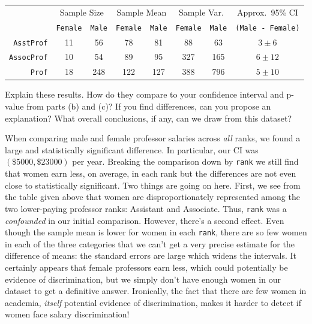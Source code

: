 \documentclass[addpoints,12pt]{exam}
\begin{document}
\begin{questions}
\begin{parts}
\vspace{1em}
\begin{tabular}
	 	{r|cc|cc|cc|c}
	 	&\multicolumn{2}{c|}{Sample Size} & \multicolumn{2}{c|}{Sample Mean} & \multicolumn{2}{c|}{Sample Var.}& Approx.\ 95\% CI\\
	 	& \texttt{Female} & \texttt{Male} & \texttt{Female} & \texttt{Male} & \texttt{Female} & \texttt{Male}&\texttt{(Male - Female)}\\
	 	\hline
	 	\texttt{AsstProf}&11&56		&78&81&88&63& $3\pm 6$\\
	 	\texttt{AssocProf}&10&54	&89&95&327&165& $6\pm  12$\\
	 	\texttt{Prof}&18&248		&122&127&388&796& $5\pm  10$
	 \end{tabular}

\vspace{1em}
	 Explain these results. How do they compare to your confidence interval and p-value from parts (b) and (c)? If you find differences, can you propose an explanation? What overall conclusions, if any, can we draw from this dataset?
	 \begin{solution}[15.5cm]
	 	When comparing male and female professor salaries across \emph{all} ranks, we found a large and statistically significant difference. In particular, our CI was $(\$5000, \$23000)$ per year. Breaking the comparison down by \texttt{rank} we still find that women earn less, on average, in each rank but the differences are not even close to statistically significant. Two things are going on here. First, we see from the table given above that women are disproportionately represented among the two lower-paying professor ranks: Assistant and Associate. Thus, \texttt{rank} was a \emph{confounded} in our initial comparison. However, there's a second effect. Even though the sample mean is lower for women in each \texttt{rank}, there are so few women in each of the three categories that we can't get a very precise estimate for the difference of means: the standard errors are large which widens the intervals. It certainly appears that female professors earn less, which could potentially be evidence of discrimination, but we simply don't have enough women in our dataset to get a definitive answer. Ironically, the fact that there are few women in academia, \emph{itself} potential evidence of discrimination, makes it harder to detect if women face salary discrimination!
	 \end{solution}
\end{parts}




\end{questions}
\end{document}
